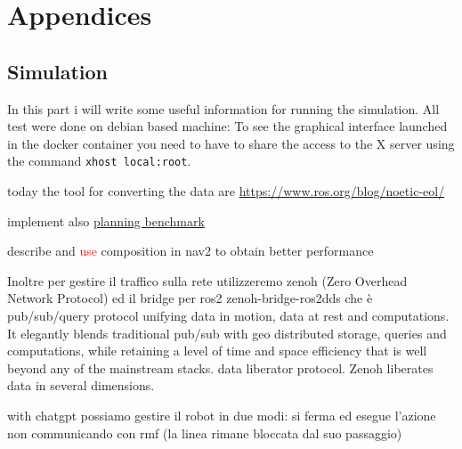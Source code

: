 \part{Appendices}
\chapter{Simulation}
In this part i will write some useful information for running the simulation.
All test were done on debian based machine:
To see the graphical interface launched in the docker container you need to have to share the access to the X server using the command \texttt{xhost local:root}.


today the tool for converting the data are 
\href{https://www.ros.org/blog/noetic-eol/}{https://www.ros.org/blog/noetic-eol/}


implement also \href{https://github.com/ros-navigation/navigation2/tree/main/tools/planner\_benchmarking}{planning benchmark}

describe and \textcolor{red}{use} composition in nav2 to obtain better performance \cite{10132508}



Inoltre per gestire il traffico sulla rete utilizzeremo zenoh (Zero Overhead Network Protocol) ed il bridge per ros2 zenoh-bridge-ros2dds che è  pub/sub/query protocol unifying data in motion, data at rest and computations. It elegantly blends traditional pub/sub with geo distributed storage, queries and computations, while retaining a level of time and space efficiency that is well beyond any of the mainstream stacks. data liberator protocol. Zenoh liberates data in several dimensions. 


with chatgpt possiamo gestire il robot in due modi: si ferma ed esegue l'azione non communicando con rmf (la linea rimane bloccata dal suo passaggio) 
